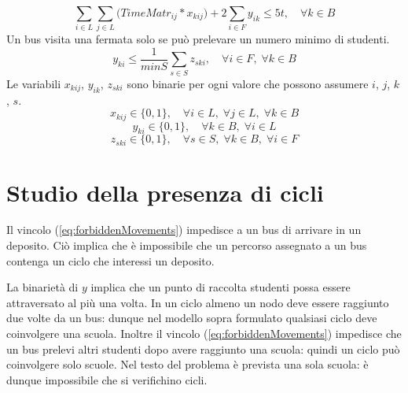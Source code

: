 \begin{equation}
  \sum_{i \in L}\sum_{j \in L}\Big(TimeMatr_{ij} * x_{kij}\Big) + 2\sum_{i \in F} y_{ik} \leq 5t, \quad \forall k \in B
\end{equation}
Un bus visita una fermata solo se può prelevare un numero minimo di studenti.
\begin{equation}
  y_{ki} \leq \frac{1}{minS}\sum_{s \in S}z_{ski}, \quad \forall i \in F,\;\forall k \in B
\end{equation}
Le variabili $x_{kij}$, $y_{ik}$, $z_{ski}$ sono binarie per ogni valore che possono assumere $i$, $j$, $k$, $s$.
\begin{equation}
    x_{kij} \in \{0,1\},\quad \forall i \in L,\;\forall j \in L,\;\forall k \in B
\end{equation}
\begin{equation}
    y_{ki} \in \{0,1\},\quad \forall k \in B,\;\forall i \in L
\end{equation}
\begin{equation}
    z_{ski} \in \{0,1\},\quad \forall s \in S,\;\forall k \in B,\;\forall i \in F
\end{equation}

\section{Studio della presenza di cicli}
Il vincolo (\ref{eq:forbiddenMovements}) impedisce a un bus di arrivare in un deposito. Ciò implica che è impossibile che un percorso assegnato a un bus contenga un ciclo che interessi un deposito.

La binarietà di $y$ implica che un punto di raccolta studenti possa essere attraversato al più una volta. In un ciclo almeno un nodo deve essere raggiunto due volte da un bus: dunque nel modello sopra formulato qualsiasi ciclo deve coinvolgere una scuola. Inoltre il vincolo (\ref{eq:forbiddenMovements}) impedisce che un bus prelevi altri studenti dopo avere raggiunto una scuola: quindi un ciclo può coinvolgere solo scuole. Nel testo del problema è prevista una sola scuola: è dunque impossibile che si verifichino cicli.

